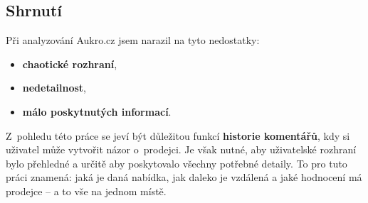 
\subsection{Shrnutí}
Při analyzování Aukro.cz jsem narazil na tyto nedostatky:
\begin{itemize}
    \item \textbf{chaotické rozhraní},
    \item \textbf{nedetailnost},
    \item \textbf{málo poskytnutých informací}.
\end{itemize}

Z~pohledu této práce se jeví být důležitou funkcí \textbf{historie komentářů}, kdy si uživatel může vytvořit názor o~prodejci. Je však nutné, aby uživatelské rozhraní bylo přehledné a určitě aby poskytovalo všechny potřebné detaily. To pro tuto práci znamená: jaká je daná nabídka, jak daleko je vzdálená a jaké hodnocení má prodejce -- a to vše na jednom místě.